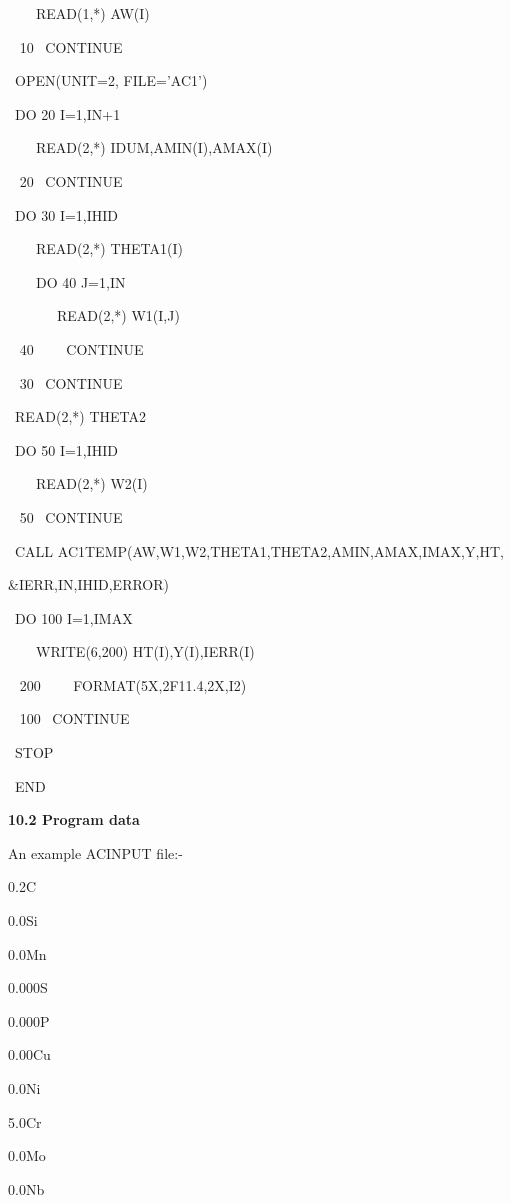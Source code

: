 \item {}        ~~~~READ(1,*) AW(I)
\item {~ 10}    ~CONTINUE
\item {}        ~OPEN(UNIT=2, FILE='AC1')
\item {}        ~DO 20 I=1,IN+1
\item {}        ~~~~READ(2,*) IDUM,AMIN(I),AMAX(I)
\item {~ 20}    ~CONTINUE
\item {}       ~DO 30 I=1,IHID
\item {}       ~~~~READ(2,*) THETA1(I)
\item {}       ~~~~DO 40 J=1,IN
\item {}       ~~~~~~~READ(2,*) W1(I,J)
\item {~ 40}   ~~~~CONTINUE
\item {~ 30}   ~CONTINUE
\item {}       ~READ(2,*) THETA2
\item {}       ~DO 50 I=1,IHID
\item {}       ~~~~READ(2,*) W2(I)
\item {~ 50}   ~CONTINUE
\item {}       ~CALL AC1TEMP(AW,W1,W2,THETA1,THETA2,AMIN,AMAX,IMAX,Y,HT,
\item {}       \&IERR,IN,IHID,ERROR)
\item {}       ~DO 100 I=1,IMAX
\item {}       ~~~~WRITE(6,200) HT(I),Y(I),IERR(I)
\item {~ 200}  ~~~~FORMAT(5X,2F11.4,2X,I2)
\item {~ 100}  ~CONTINUE
\item {}        ~STOP
\item {}        ~END
\vfill \eject
\item {} {\bf 10.2 Program data}
\bigskip
\item {} An example ACINPUT file:-
\bigskip
\item {0.2}\indent	 C
\item {0.0}\indent 	 Si
\item {0.0}\indent	 Mn
\item {0.000}\indent 	 S
\item {0.000}\indent	 P
\item {0.00}\indent	 Cu
\item {0.0}\indent	Ni
\item {5.0}\indent	Cr
\item {0.0}\indent	Mo
\item {0.0}\indent	Nb
